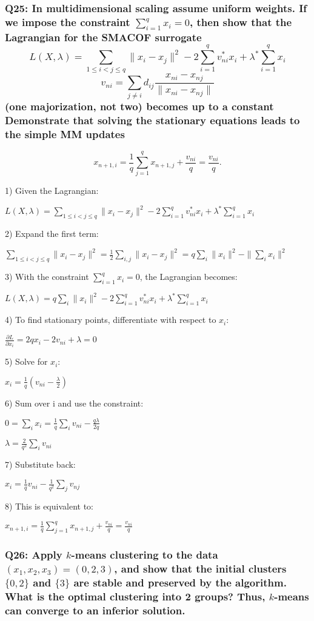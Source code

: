 \documentclass[8pt]{article}
\begin{document}
\subsubsection*{Q25: In multidimensional scaling assume uniform weights. If we impose the constraint \(\sum_{i=1}^q x_i = 0\), then show that the Lagrangian for the SMACOF surrogate
\[
L(X, \lambda) = \sum_{1 \leq i < j \leq q} \|x_i - x_j\|^2 - 2 \sum_{i=1}^q v_{ni}^* x_i + \lambda^* \sum_{i=1}^q x_i
\]
\[
v_{ni} = \sum_{j \neq i} d_{ij} \frac{x_{ni} - x_{nj}}{\|x_{ni} - x_{nj}\|}
\]
(one majorization, not two) becomes up to a constant
Demonstrate that solving the stationary equations leads to the simple MM updates}
\[
x_{n+1,i} = \frac{1}{q} \sum_{j=1}^q x_{n+1,j} + \frac{v_{ni}}{q} = \frac{v_{ni}}{q}.
\]


1) Given the Lagrangian:

   $L(X, \lambda) = \sum_{1 \leq i < j \leq q} \|x_i - x_j\|^2 - 2 \sum_{i=1}^q v_{ni}^* x_i + \lambda^* \sum_{i=1}^q x_i$

2) Expand the first term:

   $\sum_{1 \leq i < j \leq q} \|x_i - x_j\|^2 = \frac{1}{2}\sum_{i,j} \|x_i - x_j\|^2 = q\sum_i \|x_i\|^2 - \|\sum_i x_i\|^2$

3) With the constraint $\sum_{i=1}^q x_i = 0$, the Lagrangian becomes:

   $L(X, \lambda) = q\sum_i \|x_i\|^2 - 2 \sum_{i=1}^q v_{ni}^* x_i + \lambda^* \sum_{i=1}^q x_i$

4) To find stationary points, differentiate with respect to $x_i$:

   $\frac{\partial L}{\partial x_i} = 2qx_i - 2v_{ni} + \lambda = 0$

5) Solve for $x_i$:

   $x_i = \frac{1}{q}(v_{ni} - \frac{\lambda}{2})$

6) Sum over i and use the constraint:

   $0 = \sum_i x_i = \frac{1}{q}\sum_i v_{ni} - \frac{q\lambda}{2q}$

   $\lambda = \frac{2}{q^2}\sum_i v_{ni}$

7) Substitute back:

   $x_i = \frac{1}{q}v_{ni} - \frac{1}{q^2}\sum_j v_{nj}$

8) This is equivalent to:

   $x_{n+1,i} = \frac{1}{q} \sum_{j=1}^q x_{n+1,j} + \frac{v_{ni}}{q} = \frac{v_{ni}}{q}$

\subsubsection*{Q26: Apply \( k \)-means clustering to the data \((x_1, x_2, x_3) = (0, 2, 3)\), and show that the initial clusters \(\{0, 2\}\) and \(\{3\}\) are stable and preserved by the algorithm. What is the optimal clustering into 2 groups? Thus, \( k \)-means can converge to an inferior solution.}
\end{document}
